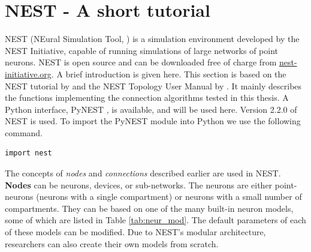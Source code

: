 \chapter{NEST - A short tutorial\label{app:nest}}

\graphicspath{{figs/appendices/}}



NEST (NEural Simulation Tool, ) is a simulation environment developed by the NEST Initiative, capable of running simulations of large networks of point neurons. NEST is open source and can be downloaded free of charge from \href{http://nest-initiative.org}{nest-initiative.org}. A brief introduction is given here. This section is based on the NEST tutorial by  and the NEST Topology User Manual by . It mainly describes the functions implementing the connection algorithms tested in this thesis. A Python interface, PyNEST , is available, and will be used here. Version 2.2.0 of NEST is used.
To import the PyNEST module into Python we use the following command.
\begin{lstlisting}
import nest
\end{lstlisting}

The concepts of \emph{nodes} and \emph{connections} described earlier are used in NEST. {\bf Nodes} can be neurons, devices, or sub-networks. The neurons are either point-neurons (neurons with a single compartment) or neurons with a small number of compartments. They can be based on one of the many built-in neuron models, some of which are listed in Table \ref{tab:neur_mod}. The default parameters of each of these models can be modified. Due to NEST's modular architecture, researchers can also create their own models from scratch. 

